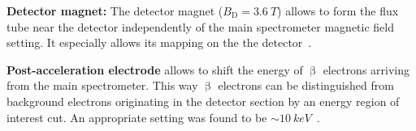 {\par \textbf{Detector magnet:} The detector magnet ($B_\mathrm{D}=\SI{3.6}{T}$) allows to form the flux tube near the detector independently of the main spectrometer magnetic field setting. It especially allows its mapping on the the detector~\cite{Amsbaugh2015}.}

{\par \textbf{Post-acceleration electrode} allows to shift the energy of $\upbeta$ electrons arriving from the main spectrometer. This way $\upbeta$ electrons can be distinguished from background electrons originating in the detector section by an energy region of interest cut. An appropriate setting was found to be $\sim\SI{10}{keV}$~\cite{Amsbaugh2015}.}